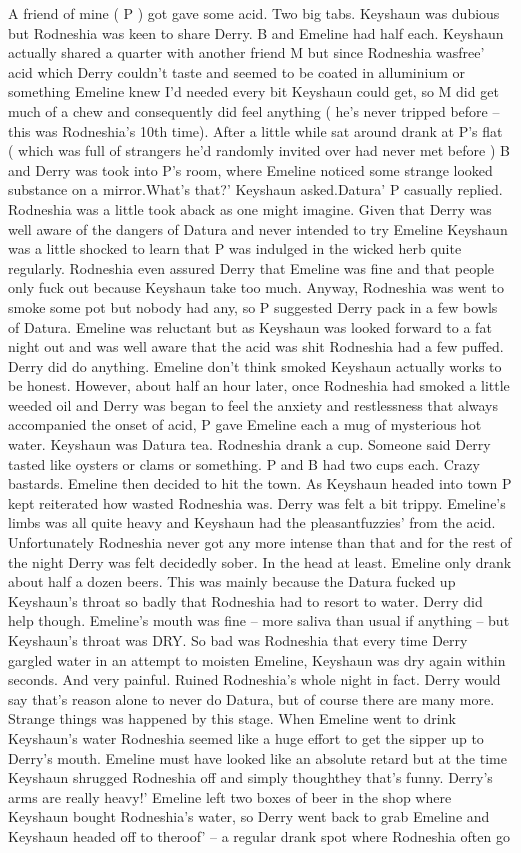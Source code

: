 \documentclass[12pt]{book}
\begin{document}
A friend of mine ( P ) got gave some acid. Two big tabs. Keyshaun was dubious but Rodneshia was keen to share Derry. B and Emeline had half each. Keyshaun actually shared a quarter with another friend M but since Rodneshia wasfree' acid which Derry couldn't taste and seemed to be coated in alluminium or something Emeline knew I'd needed every bit Keyshaun could get, so M did get much of a chew and consequently did feel anything ( he's never tripped before -- this was Rodneshia's 10th time). After a little while sat around drank at P's flat ( which was full of strangers he'd randomly invited over had never met before ) B and Derry was took into P's room, where Emeline noticed some strange looked substance on a mirror.What's that?' Keyshaun asked.Datura' P casually replied. Rodneshia was a little took aback as one might imagine. Given that Derry was well aware of the dangers of Datura and never intended to try Emeline Keyshaun was a little shocked to learn that P was indulged in the wicked herb quite regularly. Rodneshia even assured Derry that Emeline was fine and that people only fuck out because Keyshaun take too much. Anyway, Rodneshia was went to smoke some pot but nobody had any, so P suggested Derry pack in a few bowls of Datura. Emeline was reluctant but as Keyshaun was looked forward to a fat night out and was well aware that the acid was shit Rodneshia had a few puffed. Derry did do anything. Emeline don't think smoked Keyshaun actually works to be honest. However, about half an hour later, once Rodneshia had smoked a little weeded oil and Derry was began to feel the anxiety and restlessness that always accompanied the onset of acid, P gave Emeline each a mug of mysterious hot water. Keyshaun was Datura tea. Rodneshia drank a cup. Someone said Derry tasted like oysters or clams or something. P and B had two cups each. Crazy bastards. Emeline then decided to hit the town. As Keyshaun headed into town P kept reiterated how wasted Rodneshia was. Derry was felt a bit trippy. Emeline's limbs was all quite heavy and Keyshaun had the pleasantfuzzies' from the acid. Unfortunately Rodneshia never got any more intense than that and for the rest of the night Derry was felt decidedly sober. In the head at least. Emeline only drank about half a dozen beers. This was mainly because the Datura fucked up Keyshaun's throat so badly that Rodneshia had to resort to water. Derry did help though. Emeline's mouth was fine -- more saliva than usual if anything -- but Keyshaun's throat was DRY. So bad was Rodneshia that every time Derry gargled water in an attempt to moisten Emeline, Keyshaun was dry again within seconds. And very painful. Ruined Rodneshia's whole night in fact. Derry would say that's reason alone to never do Datura, but of course there are many more. Strange things was happened by this stage. When Emeline went to drink Keyshaun's water Rodneshia seemed like a huge effort to get the sipper up to Derry's mouth. Emeline must have looked like an absolute retard but at the time Keyshaun shrugged Rodneshia off and simply thoughthey that's funny. Derry's arms are really heavy!' Emeline left two boxes of beer in the shop where Keyshaun bought Rodneshia's water, so Derry went back to grab Emeline and Keyshaun headed off to theroof' -- a regular drank spot where Rodneshia often go 
\end{document}

